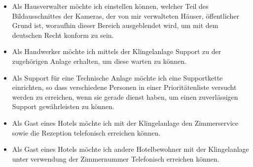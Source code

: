\begin{itemize}
    \item Als Hausverwalter möchte ich einstellen können, welcher Teil des Bildausschnittes der Kameras, der von mir verwalteten Häuser, öffentlicher Grund ist, woraufhin dieser Bereich ausgeblendet wird, um mit dem deutschen Recht konform zu sein.
    \item Als Handwerker möchte ich mittels der Klingelanlage Support zu der zugehörigen Anlage erhalten, um diese warten zu können.
    \item Als Support für eine Technische Anlage möchte ich eine Supportkette einrichten, so dass verschiedene Personen in einer Prioritätenliste versucht werden zu erreichen, wenn sie gerade dienst haben, um einen zuverlässigen Support gewährleisten zu können.
    \item Als Gast eines Hotels möchte ich mit der Klingelanlage den Zimmerservice sowie die Rezeption telefonisch erreichen können.
    \item Als Gast eines Hotels möchte ich andere Hotelbewohner mit der Klingelanlage unter verwendung der Zimmernummer Telefonisch erreichen können.
\end{itemize}